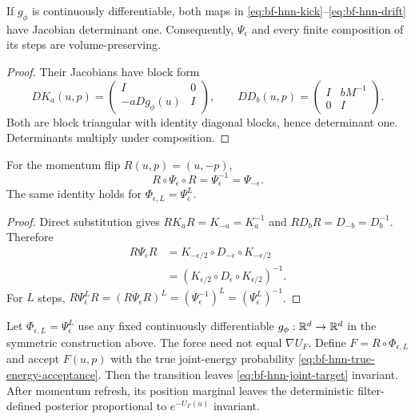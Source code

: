 \begin{lemma}
\label{lem:bf-hnn-shear-volume}
If $g_\phi$ is continuously differentiable, both maps in
\eqref{eq:bf-hnn-kick}--\eqref{eq:bf-hnn-drift} have Jacobian determinant one.
Consequently, $\Psi_\epsilon$ and every finite composition of its steps are
volume-preserving.
\end{lemma}

\begin{proof}
Their Jacobians have block form
\begin{equation}
 DK_a(u,p)=
 \begin{pmatrix}I&0\\-aDg_\phi(u)&I\end{pmatrix},\qquad
 DD_b(u,p)=
 \begin{pmatrix}I&bM^{-1}\\0&I\end{pmatrix}.
\end{equation}
Both are block triangular with identity diagonal blocks, hence determinant
one.  Determinants multiply under composition.
\end{proof}

\begin{lemma}
\label{lem:bf-hnn-kdk-reversible}
For the momentum flip $R(u,p)=(u,-p)$,
\begin{equation}
 R\circ\Psi_\epsilon\circ R=\Psi_\epsilon^{-1}=\Psi_{-\epsilon}.
 \label{eq:bf-hnn-kdk-reversibility}
\end{equation}
The same identity holds for $\Phi_{\epsilon,L}=\Psi_\epsilon^L$.
\end{lemma}

\begin{proof}
Direct substitution gives
$R K_a R=K_{-a}=K_a^{-1}$ and
$R D_b R=D_{-b}=D_b^{-1}$.  Therefore
\begin{align}
 R\Psi_\epsilon R
 &=K_{-\epsilon/2}\circ D_{-\epsilon}
   \circ K_{-\epsilon/2}\\
 &=\left(K_{\epsilon/2}\circ D_\epsilon
   \circ K_{\epsilon/2}\right)^{-1}.
\end{align}
For $L$ steps,
$R\Psi_\epsilon^L R=(R\Psi_\epsilon R)^L
=(\Psi_\epsilon^{-1})^L=(\Psi_\epsilon^L)^{-1}$.
\end{proof}

\begin{proposition}
\label{prop:bf-hnn-safe-exactness}
Let $\Phi_{\epsilon,L}=\Psi_\epsilon^L$ use any fixed continuously
differentiable $g_\phi:\mathbb{R}^d\to\mathbb{R}^d$ in the symmetric construction above.
The force need not equal $\nabla U_F$.  Define
$F=R\circ\Phi_{\epsilon,L}$ and accept $F(u,p)$ with the true joint-energy
probability \eqref{eq:bf-hnn-true-energy-acceptance}.  Then the transition
leaves \eqref{eq:bf-hnn-joint-target} invariant.  After momentum refresh, its
position marginal leaves the deterministic filter-defined posterior
proportional to $e^{-U_F(u)}$ invariant.
\end{proposition}

